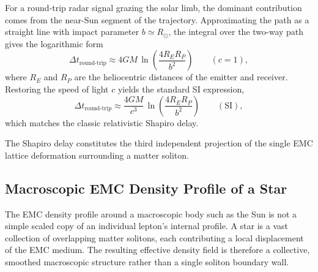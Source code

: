 \documentclass[10pt,a4paper]{article}
\begin{document}
For a round-trip radar signal grazing the solar limb, the dominant contribution
comes from the near-Sun segment of the trajectory. Approximating the
path as a straight line with impact parameter \(b \simeq R_\odot\),
the integral over the two-way path gives the logarithmic form
\begin{equation}
	\Delta t_{\text{round-trip}}
	\approx
	4GM\,
	\ln\!\left(\frac{4R_E R_P}{b^2}\right)
	\qquad
	(c=1),
	\label{eq:shapiro_log}
\end{equation}
where \(R_E\) and \(R_P\) are the heliocentric distances of the emitter
and receiver. Restoring the speed of light \(c\) yields the standard SI expression,
\begin{equation}
	\Delta t_{\text{round-trip}}
	\approx
	\frac{4GM}{c^3}\,
	\ln\!\left(\frac{4R_E R_P}{b^2}\right)
	\qquad
	(\text{SI}),
	\label{eq:shapiro_log_SI}
\end{equation}
which matches the classic relativistic Shapiro delay.

The Shapiro delay constitutes the third independent projection of the single EMC lattice deformation surrounding a matter soliton.


\subsection{Macroscopic EMC Density Profile of a Star}
\label{sec:macroscopic_emc_profile}

The EMC density profile around a macroscopic body such as the Sun is
not a simple scaled copy of an individual lepton's internal profile. A star is
a vast collection of overlapping matter solitons, each contributing a
local displacement of the EMC medium. The resulting effective density field
is therefore a collective, smoothed macroscopic structure rather than a single
soliton boundary wall.
\end{document}
